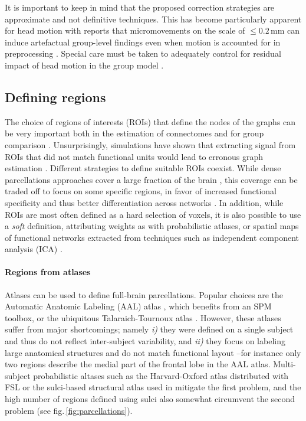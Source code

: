\documentclass[5p]{elsarticle}
\begin{document}
It is important to keep in mind that the proposed correction strategies
are approximate and not definitive techniques. This has become particularly
apparent for head motion with reports that micromovements on the scale
of $\le 0.2$\,mm can induce artefactual group-level findings even when motion is
accounted for in preprocessing
\cite{vandijk2012,power2011,satterthwaite2013}. Special care must be taken to
adequately control for residual impact of head motion in the group model
\cite{satterthwaite2013,vandijk2012}.

%

\subsection{Defining regions}

The choice of regions of interests (ROIs) that define the nodes of the
graphs can be very important both in the estimation of connectomes and
for group comparison \cite{wang2009}. Unsurprisingly, simulations have
shown that extracting signal from ROIs that did not match functional
units would lead to erronous graph estimation \cite{smith2011}.
%
Different strategies to define suitable ROIs coexist. While dense parcellations approaches cover
a large fraction of the brain \cite{achard2006, varoquaux2010c,
wang2009,bellec2006,craddock2012}, this coverage can be traded off to focus on some specific
regions, in favor of increased functional specificity and thus better
differentiation across networks \cite{greicius2003, dosenbach2006,
varoquaux2010b}. In addition, while
ROIs are most often defined as a hard selection of voxels, it is also
possible to use a \emph{soft} definition, attributing weights as with
probabilistic atlases, or spatial maps of functional networks extracted
from techniques such as independent component analysis (ICA) \cite{kiviniemi2009,smith2012}.

\paragraph{Regions from atlases}
%
Atlases can be used to define full-brain parcellations. Popular
choices are the Automatic Anatomic Labeling (AAL) atlas \cite{tzourio-mazoyer2002a}, 
which benefits from an SPM toolbox, or the ubiquitous Talaraich-Tournoux
atlas \cite{talairach1988}. 
However, these atlases suffer from major
shortcomings; namely \emph{i)} they were defined on a single subject
and thus do not reflect inter-subject variability, and \emph{ii)}
they focus on labeling large anatomical structures and do not match
functional layout --for instance only two regions describe the medial
part of the frontal lobe in the AAL atlas. Multi-subject probabilistic altases such as the
Harvard-Oxford atlas distributed with FSL \cite{smith2004} or the
sulci-based structural atlas used in \cite{varoquaux2010c} mitigate the
first problem, and the high number of regions defined using sulci also
somewhat circumvent the second problem (see fig.\,\ref{fig:parcellations}).
\end{document}

